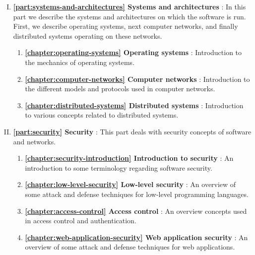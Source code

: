 \begin{enumerate}[I.]
	\item \textbf{\autoref{part:systems-and-architectures} Systems and architectures} : In this part we describe the systems and architectures on which the software is run. First, we describe operating systems, next computer networks, and finally distributed systems operating on these networks.
		\begin{enumerate}[1.]
			\item \textbf{\autoref{chapter:operating-systems} Operating systems} : Introduction to the mechanics of operating systems.
			\item \textbf{\autoref{chapter:computer-networks} Computer networks} : Introduction to the different models and protocols used in computer networks.
			\item \textbf{\autoref{chapter:distributed-systems} Distributed systems} : Introduction to various concepts related to distributed systems.
		\end{enumerate}


	\item \textbf{\autoref{part:security} Security} : This part deals with security concepts of software and networks.
		\begin{enumerate}[1.]
			\item \textbf{\autoref{chapter:security-introduction} Introduction to security} : An introduction to some terminology regarding software security.
			\item \textbf{\autoref{chapter:low-level-security} Low-level security} : An overview of some attack and defense techniques for low-level programming languages.
			\item \textbf{\autoref{chapter:access-control} Access control} : An overview concepts used in access control and authentication.
			\item \textbf{\autoref{chapter:web-application-security} Web application security} : An overview of some attack and defense techniques for web applications.
		\end{enumerate}



\end{enumerate}
